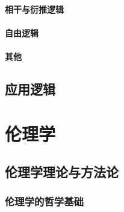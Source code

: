 \documentclass[UTF8]{../RepresentationUniverse}
\begin{document}
    \subsubsection{相干与衍推逻辑}
    \subsubsection{自由逻辑}
    \subsubsection{其他}
\section{应用逻辑}





\chapter{伦理学}
\section{伦理学理论与方法论}
    \subsection{伦理学的哲学基础}
\end{document}
